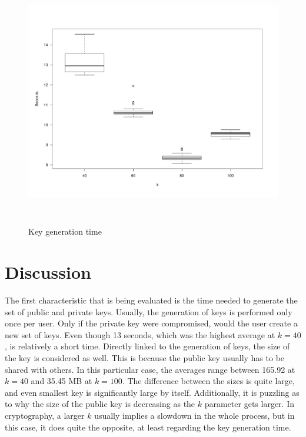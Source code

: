 \begin{figure}[H]
  \centerline{\includegraphics[height=11cm]{img/experimentplot}}
  \caption{Key generation time}
\end{figure}


\section{Discussion}

The first characteristic that is being evaluated is the time needed to generate the set of public and private keys. Usually, the generation of keys is performed only once per user. Only if the private key were compromised, would the user create a new set of keys. Even though 13 seconds, which was the highest average at $k=40$, is relatively a short time. Directly linked to the generation of keys, the size of the key is considered as well. This is because the public key usually has to be shared with others. In this particular case, the averages range between 165.92 at $k=40$  and 35.45 MB at $k=100$. The difference between the sizes is quite large, and even smallest key is significantly large by itself. Additionally, it is puzzling as to why the size of the public key is decreasing as the $k$ parameter gets larger. In cryptography, a larger $k$ usually implies a slowdown in the whole process, but in this case, it does quite the opposite, at least regarding the key generation time.


